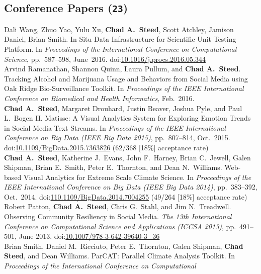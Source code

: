 \documentclass[11pt, a4paper]{article}
\newcommand{\years}[1]{\marginnote{\scriptsize #1}}
\begin{document}
\subsection*{Conference Papers (\texttt{23})}
\begin{sloppypar}
\noindent\years{2016}Dali Wang, Zhuo Yao, Yulu Xu, \textbf{Chad A.\ Steed},
Scott Atchley, Jamison Daniel, Brian Smith. In Situ Data Infrastructure for
Scientific Unit Testing Platform.
In \emph{Proceedings of the International Conference on Computational Science},
pp.\ 587--598, June\ 2016. doi:\href{http://dx.doi.org/10.1016/j.procs.2016.05.344}{10.1016/j.procs.2016.05.344}\\
\years{2016}Arvind Ramanathan, Shannon Quinn, Laura Pullum, and
\textbf{Chad A.\ Steed}. Tracking Alcohol and Marijuana Usage and Behaviors
from Social Media using Oak Ridge Bio-Surveillance Toolkit.
In \emph{Proceedings of the IEEE International Conference on Biomedical and
Health Informatics}, Feb.\ 2016.\\
\years{2015}\textbf{Chad A.\ Steed}, Margaret Drouhard, Justin
Beaver, Joshua Pyle, and Paul L.\ Bogen II. Matisse: A Visual Analytics
System for Exploring Emotion Trends in Social Media Text Streams.
In \emph{Proceedings of the IEEE International Conference on Big Data (IEEE
Big Data 2015)}, pp.\ 807--814, Oct.\ 2015. doi:\href{http://dx.doi.org/10.1109/BigData.2015.7363826}{10.1109/BigData.2015.7363826} (62/368 [18\%] acceptance rate)\\
\years{2014}\textbf{Chad A.\ Steed}, Katherine J.\ Evans, John F.\ Harney,
Brian C.\ Jewell, Galen Shipman, Brian E.\ Smith, Peter E.\ Thornton, and
Dean N.\ Williams. Web-based Visual Analytics for Extreme Scale Climate Science.
In \emph{Proceedings of the IEEE International Conference on Big Data (IEEE Big Data 2014)},
pp.\ 383--392, Oct.\ 2014.
doi:\href{http://dx.doi.org/10.1109/BigData.2014.7004255}{110.1109/BigData.2014.7004255} (49/264 [18\%] acceptance rate)\\
\years{2013}Robert Patton, \textbf{Chad A.\ Steed}, Chris G.\ Stahl, and
Jim N.\ Treadwell. Observing Community Resiliency in Social Media. \emph{The 13th
International Conference on Computational Science and Applications (ICCSA 2013)},
pp.\ 491--501, June 2013.
doi:\href{http://dx.doi.org/10.1007/978-3-642-39640-3\_36}{10.1007/978-3-642-39640-3\_36} \\
\years{2013}Brian Smith, Daniel M.\ Ricciuto, Peter E.\ Thornton, Galen Shipman,
\textbf{Chad Steed}, and Dean Williams. ParCAT: Parallel Climate Analysis Toolkit.
In \emph{Proceedings of the International Conference on Computational
}
\end{sloppypar}
\end{document}
